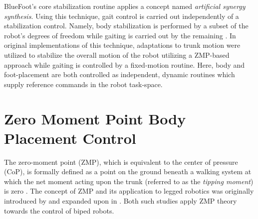 		BlueFoot's core stabilization routine applies a concept named \emph{artificial synergy synthesis}. Using this technique, gait control is carried out independently of a stabilization control. Namely, body stabilization is performed by a subset of the robot's degrees of freedom while gaiting is carried out by the remaining \cite{Vuko1972,Yamaguchi1993}. In original implementations of this technique, adaptations to trunk motion were utilized to stabilize the overall motion of the robot utilizing a ZMP-based approach while gaiting is controlled by a fixed-motion routine. Here, body and foot-placement are both controlled as independent, dynamic routines which supply reference commands in the robot task-space. %




	\section{Zero Moment Point Body Placement Control}

		The zero-moment point (ZMP), which is equivalent to the center of pressure (CoP), is formally defined as a point on the ground beneath a walking system at which the net moment acting upon the trunk (referred to as the \emph{tipping moment}) is zero \cite{Sardain2004}. The concept of ZMP and its application to legged robotics was originally introduced by \cite{Vuko1972} and expanded upon in \cite{Goswami1999}. Both such studies apply ZMP theory towards the control of biped robots.

